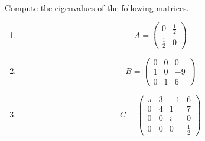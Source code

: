 Compute the eigenvalues of the following matrices.
\begin{enumerate}
	\item $$ A= 
		\begin{pmatrix}
		0&\frac{1}{2}\\
		\frac{1}{2}&0
		\end{pmatrix}
		$$
	\item
	$$ B=
	\begin{pmatrix}
	0&0&0\\
	1&0&-9\\
	0&1&6
	\end{pmatrix}
	$$
		\item $$C=
	\begin{pmatrix}
	\pi& 3& -1& 6\\
	0 & 4& 1  & 7\\
	0 & 0& i  & 0\\
	0 & 0& 0  & \frac{1}{2}
	\end{pmatrix}
	$$

\end{enumerate}
 